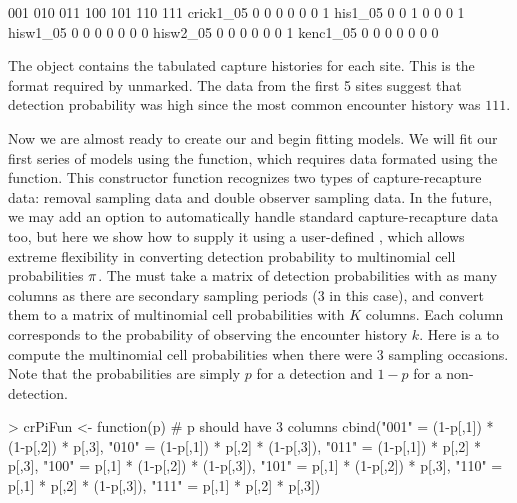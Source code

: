 \documentclass[a4paper]{article}
\renewenvironment{Schunk}{\vspace{\topsep}}{\vspace{\topsep}}
\begin{document}
\begin{Schunk}
\begin{Soutput}
            001 010 011 100 101 110 111
  crick1_05   0   0   0   0   0   0   1
  his1_05     0   0   1   0   0   0   1
  hisw1_05    0   0   0   0   0   0   0
  hisw2_05    0   0   0   0   0   0   1
  kenc1_05    0   0   0   0   0   0   0
\end{Soutput}
\end{Schunk}
The object  contains the tabulated capture histories for
each site. This is the format required by unmarked. The data from
the first 5 sites
suggest that detection probability was high since the most
common encounter history was $111$.

Now we are almost ready to create our  and begin
fitting models. We will fit our first series of models using the
 function, which requires data formated using the
 function. This constructor function
recognizes two types of capture-recapture data: removal sampling
data and double observer sampling data. In the future, we may add an
option to automatically handle standard capture-recapture data too,
but here we show how to supply it using a user-defined ,
which allows extreme flexibility in converting detection probability
to multinomial cell probabilities $\bold \pi$. The  must
take a matrix of detection probabilities with as many columns as there
are secondary sampling periods (3 in this case), and convert them to a
matrix of multinomial
cell probabilities with $K$ columns. Each column corresponds to the
probability of observing the encounter history $k$. Here is a
 to compute the multinomial cell probabilities when there
were 3 sampling occasions. Note that the probabilities are simply $p$
for a detection and $1-p$ for a non-detection.

\begin{Schunk}
\begin{Sinput}
> crPiFun <- function(p) { # p should have 3 columns
     cbind("001" = (1-p[,1]) * (1-p[,2]) * p[,3],
           "010" = (1-p[,1]) * p[,2]     * (1-p[,3]),
           "011" = (1-p[,1]) * p[,2]     * p[,3],
           "100" = p[,1]     * (1-p[,2]) * (1-p[,3]),
           "101" = p[,1]     * (1-p[,2]) * p[,3],
           "110" = p[,1]     * p[,2]     * (1-p[,3]),
           "111" = p[,1]     * p[,2]     * p[,3])
 }
\end{Sinput}
\end{Schunk}
\end{document}
